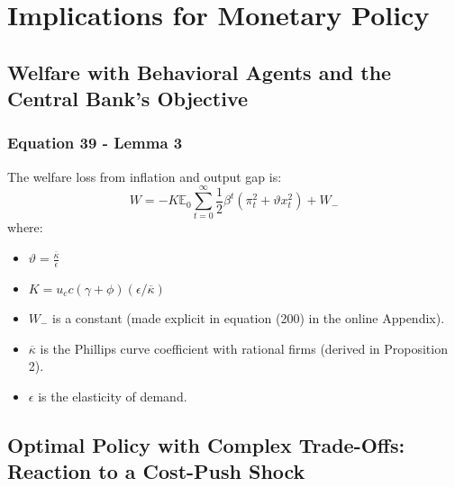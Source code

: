 \documentclass{article}
\begin{document}
\section{Implications for Monetary Policy}

\subsection{Welfare with Behavioral Agents and the Central Bank’s Objective}

\subsubsection*{Equation 39 - Lemma 3}
The welfare loss from inflation and output gap is:
\begin{equation}\tag{39}
    W=-K\mathbb{E}_{0}\sum_{t=0}^{\infty}\frac{1}{2}\beta^{t}\left(\pi_{t}^{2}+\vartheta x_{t}^{2}\right)+W_{-}
\end{equation}
where:
\begin{itemize}
    \item $\vartheta=\frac{\overline{\kappa}}{\epsilon}$
    \item $K=u_{c}c\left(\gamma+\phi\right)\left(\epsilon/\overline{\kappa}\right)$
    \item $W_{-}$ is a constant (made explicit in
equation (200) in the online Appendix).
    \item $\overline{\kappa}$ is the Phillips curve coefficient with rational firms (derived in Proposition 2).
    \item $\epsilon$ is the elasticity of demand.
\end{itemize}

\subsection{Optimal Policy with Complex Trade-Offs: Reaction to a Cost-Push Shock}
\end{document}

